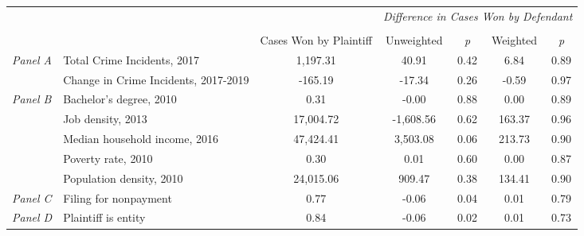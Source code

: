 \begin{tabular}{llccccc}
\toprule
 &  & \textit{} & \multicolumn{4}{c}{\textit{Difference in Cases Won by Defendant}} \\
\cline{4-7}
\\
 &  & Cases Won by Plaintiff & Unweighted & \emph{p} & Weighted & \emph{p} \\
\midrule
\multirow[c]{2}{.75cm}{\textit{Panel A}} & Total Crime Incidents, 2017 & 1,197.31 & 40.91 & 0.42 & 6.84 & 0.89 \\
 & Change in Crime Incidents, 2017-2019 & -165.19 & -17.34 & 0.26 & -0.59 & 0.97 \\
\cline{1-7}
\multirow[c]{5}{.75cm}{\textit{Panel B}} & Bachelor's degree, 2010 & 0.31 & -0.00 & 0.88 & 0.00 & 0.89 \\
 & Job density, 2013 & 17,004.72 & -1,608.56 & 0.62 & 163.37 & 0.96 \\
 & Median household income, 2016 & 47,424.41 & 3,503.08 & 0.06 & 213.73 & 0.90 \\
 & Poverty rate, 2010 & 0.30 & 0.01 & 0.60 & 0.00 & 0.87 \\
 & Population density, 2010 & 24,015.06 & 909.47 & 0.38 & 134.41 & 0.90 \\
\cline{1-7}
\textit{Panel C} & Filing for nonpayment & 0.77 & -0.06 & 0.04 & 0.01 & 0.79 \\
\cline{1-7}
\textit{Panel D} & Plaintiff is entity & 0.84 & -0.06 & 0.02 & 0.01 & 0.73 \\
\cline{1-7}
\bottomrule
\end{tabular}
